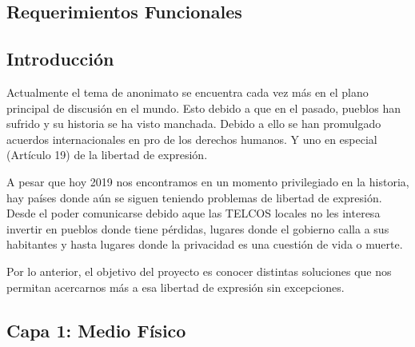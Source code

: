 \documentclass[11pt,a4paper]{scrartcl}			%
\begin{document}
\begin{multicols*}{2}


\section{Requerimientos Funcionales}\label{requerimientos-funcionales}

\subsection{Introducción}\label{introducciuxf3n}

Actualmente el tema de anonimato se encuentra cada vez más en el plano
principal de discusión en el mundo. Esto debido a que en el pasado,
pueblos han sufrido y su historia se ha visto manchada. Debido a ello se
han promulgado acuerdos internacionales en pro de los derechos humanos.
Y uno en especial (Artículo 19) de la libertad de expresión.

A pesar que hoy 2019 nos encontramos en un momento privilegiado en la
historia, hay países donde aún se siguen teniendo problemas de libertad
de expresión. Desde el poder comunicarse debido aque las TELCOS locales
no les interesa invertir en pueblos donde tiene pérdidas, lugares donde
el gobierno calla a sus habitantes y hasta lugares donde la privacidad
es una cuestión de vida o muerte.

Por lo anterior, el objetivo del proyecto es conocer distintas
soluciones que nos permitan acercarnos más a esa libertad de expresión
sin excepciones.

\subsection{Capa 1: Medio Físico}\label{capa-1-medio-fuxedsico}


\end{multicols*}
\end{document}
